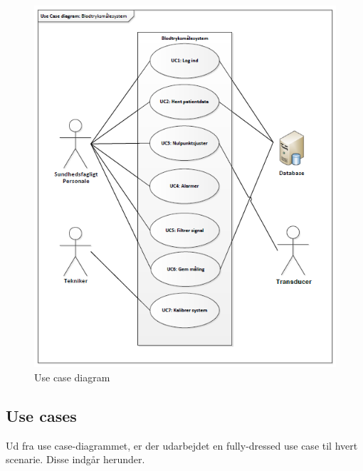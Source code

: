 \begin{figure}[H]
\centering
\includegraphics[scale=0.95]{uc.PNG}
\caption{Use case diagram}
\end{figure}

\newpage

\subsection{Use cases}
Ud fra use case-diagrammet, er der udarbejdet en fully-dressed use case til hvert scenarie. Disse indgår herunder. 
\\


